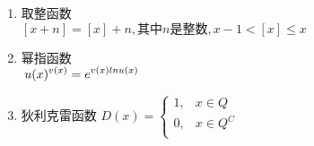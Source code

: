 \begin{enumerate}
    \item 取整函数\\
    $[x+n]=[x]+n,其中n是整数,x-1<[x]\le x $
    
    \item 幂指函数\\
    $\displaystyle\hspace{.2em} u(x)^{v(x)}=e^{v(x)lnu(x)}$
    
    \item 狄利克雷函数
    {
        $D(x)=\left\{
            \begin{array}{cl}
                1,&x\in Q\\
                0,&x\in Q^C\\
            \end{array}
            \right.$
    }
\end{enumerate}

